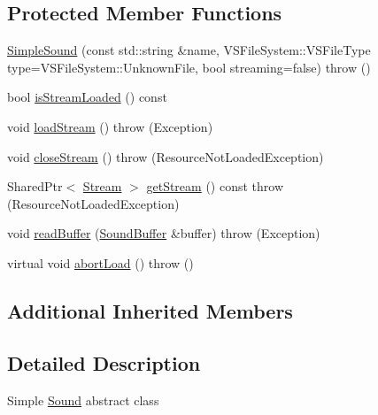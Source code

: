 \subsection*{Protected Member Functions}
\begin{DoxyCompactItemize}
\item 
\hyperlink{classAudio_1_1SimpleSound_af847f302e1bf8c39d5626752c76ee400}{Simple\+Sound} (const std\+::string \&name, V\+S\+File\+System\+::\+V\+S\+File\+Type type=V\+S\+File\+System\+::\+Unknown\+File, bool streaming=false)  throw ()
\item 
bool \hyperlink{classAudio_1_1SimpleSound_aa3afde47046eefb4ea193aa13c24aee4}{is\+Stream\+Loaded} () const 
\item 
void \hyperlink{classAudio_1_1SimpleSound_a07f1ea79c9208ea7a79b4b42f186d0a0}{load\+Stream} ()  throw (\+Exception)
\item 
void \hyperlink{classAudio_1_1SimpleSound_ab913f6768fc1bff17c78deec94e3375d}{close\+Stream} ()  throw (\+Resource\+Not\+Loaded\+Exception)
\item 
Shared\+Ptr$<$ \hyperlink{classAudio_1_1Stream}{Stream} $>$ \hyperlink{classAudio_1_1SimpleSound_add557853513a4a92d0874606033ef039}{get\+Stream} () const   throw (\+Resource\+Not\+Loaded\+Exception)
\item 
void \hyperlink{classAudio_1_1SimpleSound_a392851954fb6abb90a942ce5054fb649}{read\+Buffer} (\hyperlink{classAudio_1_1SoundBuffer}{Sound\+Buffer} \&buffer)  throw (\+Exception)
\item 
virtual void \hyperlink{classAudio_1_1SimpleSound_a21e84a0a9ece8abce078fb316845e32f}{abort\+Load} ()  throw ()
\end{DoxyCompactItemize}
\subsection*{Additional Inherited Members}


\subsection{Detailed Description}
Simple \hyperlink{classAudio_1_1Sound}{Sound} abstract class

